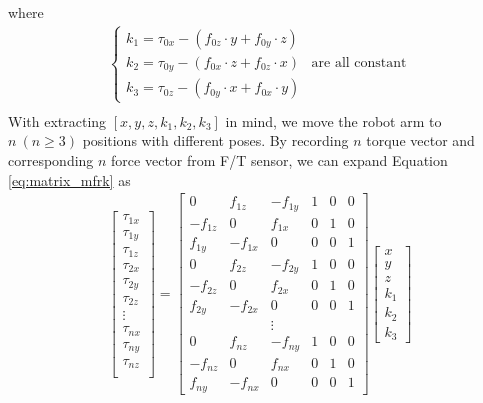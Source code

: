 where
\begin{equation}\label{eq:k1k2k3}
\begin{split}
\left\{\begin{matrix}
k_1 = \tau _{0x} - \left( f_{0z} \cdot y + f_{0y} \cdot z \right)  &  \\
k_2 = \tau _{0y} - \left( f_{0x} \cdot z + f_{0z} \cdot x \right)  &\text{are all constant} \\
k_3 = \tau _{0z} - \left( f_{0y} \cdot x + f_{0x} \cdot y \right)  & 
\end{matrix}\right.\\
\end{split}
\end{equation}
With extracting $[x,y,z,k_1,k_2,k_3]$ in mind, we move the robot arm to $n\ (n\geq3)$ positions with different poses. By recording $n$ torque vector and corresponding $n$ force vector from F/T sensor, we can expand Equation \ref{eq:matrix_mfrk} as
\begin{equation}
\begin{split}
\begin{bmatrix}
\tau _{1x}\\
\tau _{1y}\\
\tau _{1z}\\
\tau _{2x}\\
\tau _{2y}\\
\tau _{2z}\\
\vdots\\
\tau _{nx}\\
\tau _{ny}\\
\tau _{nz}\\
\end{bmatrix}
=
\begin{bmatrix}
0			&f_{1z}		&-f_{1y}	&1	&0	&0\\
-f_{1z}		&0			&f_{1x}		&0	&1	&0\\
f_{1y}		&-f_{1x}	&0			&0	&0	&1\\
0			&f_{2z}		&-f_{2y}	&1	&0	&0\\
-f_{2z}		&0			&f_{2x}		&0	&1	&0\\
f_{2y}		&-f_{2x}	&0			&0	&0	&1\\
 			& 			&\vdots		& 	& 	& \\
0			&f_{nz}		&-f_{ny}	&1	&0	&0\\
-f_{nz}		&0			&f_{nx}		&0	&1	&0\\
f_{ny}		&-f_{nx}	&0			&0	&0	&1
\end{bmatrix}
\begin{bmatrix}
x\\
y\\
z\\
k_1\\
k_2\\
k_3
\end{bmatrix}\\
\end{split}
\end{equation}

